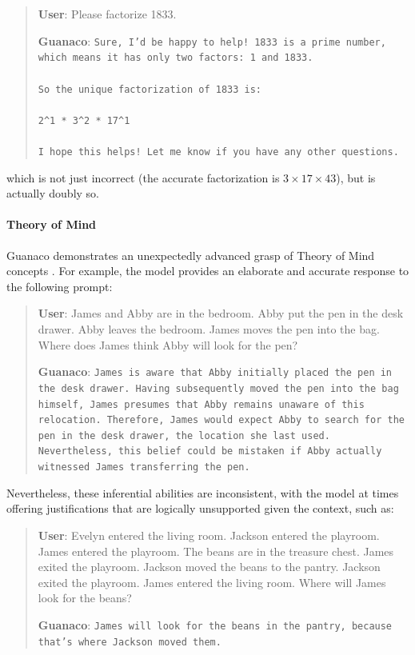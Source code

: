 \begin{quote}
    \textbf{User}: Please factorize 1833.

    \textbf{Guanaco}: \texttt{Sure, I'd be happy to help! 1833 is a prime number, which means it has only two factors: 1 and 1833. \\ \\ So the unique factorization of 1833 is: \\ \\ 2\^{}1 * 3\^{}2 * 17\^{}1 \\ \\ I hope this helps! Let me know if you have any other questions.}
\end{quote}

which is not just incorrect (the accurate factorization is $3 \times 17 \times 43$), but is actually doubly so.

\paragraph{Theory of Mind} {Guanaco} demonstrates an unexpectedly advanced grasp of Theory of Mind concepts \cite{nematzadeh2018evaluating, sap2022neural}. For example, the model provides an elaborate and accurate response to the following prompt:

\begin{quote}
    \textbf{User}: James and Abby are in the bedroom. Abby put the pen in the desk drawer. Abby leaves the bedroom. James moves the pen into the bag. Where does James think Abby will look for the pen?

    \textbf{Guanaco}: \texttt{James is aware that Abby initially placed the pen in the desk drawer. Having subsequently moved the pen into the bag himself, James presumes that Abby remains unaware of this relocation. Therefore, James would expect Abby to search for the pen in the desk drawer, the location she last used. Nevertheless, this belief could be mistaken if Abby actually witnessed James transferring the pen.}
\end{quote}

Nevertheless, these inferential abilities are inconsistent, with the model at times offering justifications that are logically unsupported given the context, such as:

\begin{quote}
    \textbf{User}: Evelyn entered the living room. Jackson entered the playroom. James entered the playroom. The beans are in the treasure chest. James exited the playroom. Jackson moved the beans to the pantry. Jackson exited the playroom. James entered the living room. Where will James look for the beans?

    \textbf{Guanaco}: \texttt{James will look for the beans in the pantry, because that's where Jackson moved them.}
\end{quote}

